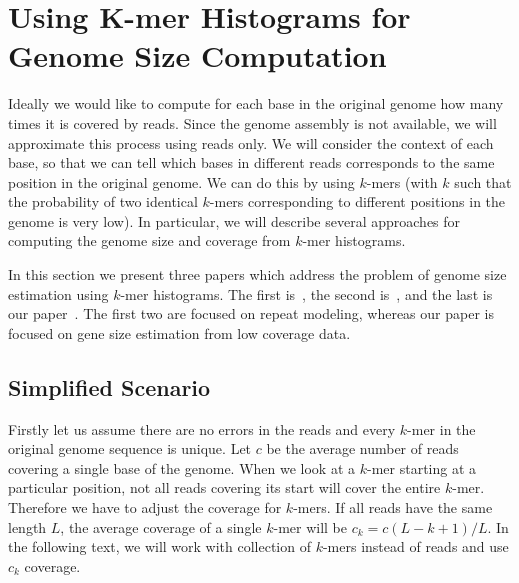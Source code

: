 \section[K-mer Histograms]{Using K-mer Histograms for Genome Size Computation}\label{sec:kmerhist}

Ideally we would like to compute for each base in the original genome how many times it is covered by reads. Since the genome assembly is not available, we will approximate this process using reads only. We will consider the context of each base, so that we can tell which bases in different reads corresponds to the same position in the original genome. We can do this by using $k$-mers (with $k$ such that the probability of two identical $k$-mers corresponding to different positions in the genome is very low). In particular, we will describe several approaches for computing the genome size and coverage from $k$-mer histograms.

In this section we present three papers which address the problem of genome size estimation using $k$-mer histograms. The first is~\cite{waterman}, the second is~\cite{williams}, and the last is our paper~\cite{covest}. The first two are focused on repeat modeling, whereas our paper is focused on gene size estimation from low coverage data.

\subsection{Simplified Scenario}

Firstly let us assume there are no errors in the reads and every $k$-mer in the original genome sequence is unique.
Let $c$ be the average number of reads covering a single base of the genome. When we look at a $k$-mer starting at a particular position, not all reads covering its start will cover the entire $k$-mer.
Therefore we have to adjust the coverage for $k$-mers.
If all reads have the same length $L$, the average coverage of a single $k$-mer will be $c_k = c (L - k + 1)/L$.
In the following text, we will work with collection of $k$-mers instead of reads and use $c_k$ coverage.

